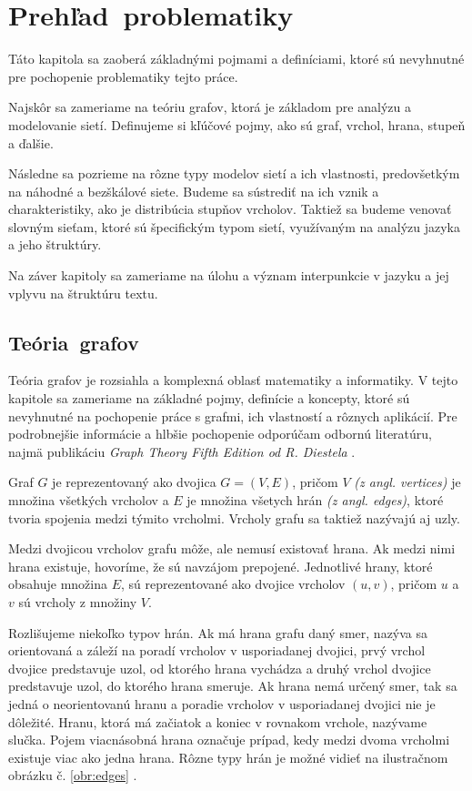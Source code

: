 \chapter{Prehľad~problematiky}\label{ch:terminology}

Táto kapitola sa zaoberá základnými pojmami a definíciami, ktoré sú nevyhnutné pre pochopenie problematiky tejto práce.

Najskôr sa zameriame na teóriu grafov, ktorá je základom pre analýzu a modelovanie sietí. Definujeme si kľúčové pojmy, ako sú graf,
vrchol, hrana, stupeň a ďalšie. 

Následne sa pozrieme na rôzne typy modelov sietí a ich vlastnosti, predovšetkým na náhodné a
bezškálové siete. Budeme sa sústrediť na ich vznik a charakteristiky, ako je distribúcia stupňov vrcholov.
Taktiež sa budeme venovať slovným sieťam, ktoré sú špecifickým typom sietí, využívaným na analýzu jazyka a
jeho štruktúry.

Na záver kapitoly sa zameriame na úlohu a význam interpunkcie v jazyku a jej vplyvu na štruktúru textu.

\section{Teória~grafov}\label{sec:graph-theory}

Teória grafov je rozsiahla a komplexná oblasť matematiky a informatiky. V tejto kapitole sa zameriame na základné 
pojmy, definície a koncepty, ktoré sú nevyhnutné na pochopenie práce s grafmi, ich vlastností a rôznych aplikácií. 
Pre podrobnejšie informácie a hlbšie pochopenie odporúčam odbornú literatúru, najmä publikáciu
\textit{Graph Theory Fifth Edition od R. Diestela} \cite{diestel2017graph} .

Graf $G$ je reprezentovaný ako dvojica $G = (V, E)$, pričom $V$ \textit{(z angl. vertices)} je množina všetkých
vrcholov a $E$ je množina všetych hrán \textit{(z angl. edges)}, ktoré tvoria spojenia medzi týmito vrcholmi.
Vrcholy grafu sa taktiež nazývajú aj uzly.

Medzi dvojicou vrcholov grafu môže, ale nemusí existovať hrana. Ak medzi nimi hrana existuje, hovoríme, že sú
navzájom prepojené. Jednotlivé hrany, ktoré obsahuje množina $E$, sú reprezentované ako dvojice vrcholov $(u, v)$, 
pričom $u$ a $v$ sú vrcholy z množiny $V$. 

Rozlišujeme niekoľko typov hrán. Ak má hrana grafu daný smer, nazýva sa orientovaná a záleží
na poradí vrcholov v usporiadanej dvojici, prvý vrchol dvojice predstavuje uzol, od ktorého hrana vychádza a 
druhý vrchol dvojice predstavuje uzol, do ktorého hrana smeruje. Ak hrana nemá určený smer, tak sa jedná o 
neorientovanú hranu a poradie vrcholov v usporiadanej dvojici nie je dôležité. Hranu, ktorá má začiatok a koniec 
v rovnakom vrchole, nazývame slučka. Pojem viacnásobná hrana označuje prípad, kedy medzi dvoma vrcholmi existuje viac ako jedna hrana. 
Rôzne typy hrán je možné vidieť na ilustračnom obrázku č. \ref{obr:edges} .

